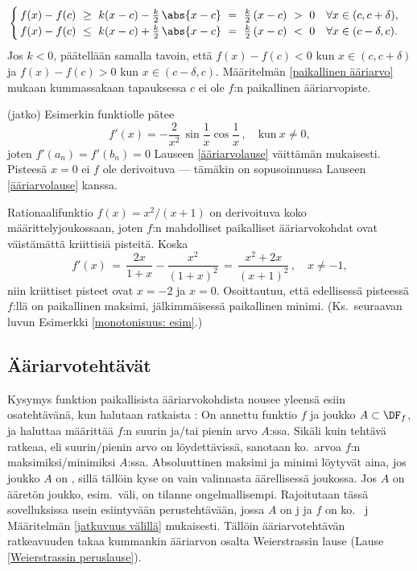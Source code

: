 \[
\begin{cases}
\,f(x)-f(c)\ \ge\ k(x-c) - \frac{k}{2}\,\abs{x-c}
           \ =\ \frac{k}{2}\,(x-c)\ >\ 0 \quad \forall x\in(c,c+\delta), \\
\,f(x)-f(c)\ \le\ k(x-c) + \frac{k}{2}\,\abs{x-c} 
           \ =\ \frac{k}{2}\,(x-c)\ <\ 0 \quad \forall x\in(c-\delta,c).
\end{cases}
\]
Jos $k<0$, päätellään samalla tavoin, että $f(x)-f(c)<0$ kun $x \in (c,c+\delta)$ ja 
$f(x)-f(c)>0$ kun $x \in (c-\delta,c)$. Määritelmän \ref{paikallinen ääriarvo} mukaan 
kummassakaan tapauksessa $c$ ei ole $f$:n paikallinen ääriarvopiste. \loppu
\jatko \begin{Exa} (jatko) Esimerkin funktiolle pätee
\[
f'(x) = -\frac{2}{x^2}\,\sin\frac{1}{x}\cos\frac{1}{x}\,, \quad \text{kun}\ x \neq 0,
\]
joten $f'(a_n)=f'(b_n)=0$ Lauseen \ref{ääriarvolause} väittämän mukaisesti. Pisteesä $x=0$ ei
$f$ ole derivoituva --- tämäkin on sopusoinnussa Lauseen \ref{ääriarvolause} kanssa. \loppu
\end{Exa}
\begin{Exa} \label{kriittiset pisteet: esim} Rationaalifunktio $f(x)=x^2/(x+1)$ on derivoituva
koko määrittelyjoukossaan, joten $f$:n mahdolliset paikalliset ääriarvokohdat ovat väistämättä
kriittisiä pisteitä. Koska
\[
f'(x) \,=\, \frac{2x}{1+x}-\frac{x^2}{(1+x)^2} 
      \,=\, \frac{x^2+2x}{(x+1)^2}\,, \quad x \neq -1,
\]
niin kriittiset pisteet ovat $x=-2$ ja $x=0$. Osoittautuu, että edellisessä pisteessä $f$:llä
on paikallinen maksimi, jälkimmäisessä paikallinen minimi. (Ks.\ seuraavan luvun Esimerkki
\ref{monotonisuus: esim}.) \loppu
\end{Exa}

\subsection{Ääriarvotehtävät}

Kysymys funktion paikallisista ääriarvokohdista nousee yleensä esiin osatehtävänä, kun halutaan
ratkaista : On annettu funktio $f$ ja joukko $A\subset\DF_f$, ja haluttaa
määrittää $f$:n suurin ja/tai pienin arvo $A$:ssa. Sikäli kuin tehtävä ratkeaa, eli 
suurin/pienin arvo on löydettävissä, sanotaan ko.\ arvoa $f$:n
 
%
 maksimiksi/minimiksi $A$:ssa. Absoluuttinen maksimi ja minimi löytyvät
aina, jos joukko $A$ on , sillä tällöin kyse on vain valinnasta äärellisessä
joukossa. Jos $A$ on ääretön joukko, esim.\ väli, on tilanne ongelmallisempi. Rajoitutaan tässä
sovelluksissa usein esiintyvään perustehtävään, jossa $A$ on j 
ja $f$ on ko.\  j Määritelmän \ref{jatkuvuus välillä} mukaisesti.
Tällöin ääriarvotehtävän ratkeavuuden takaa kummankin ääriarvon osalta Weierstrassin lause
(Lause \ref{Weierstrassin peruslause}).

